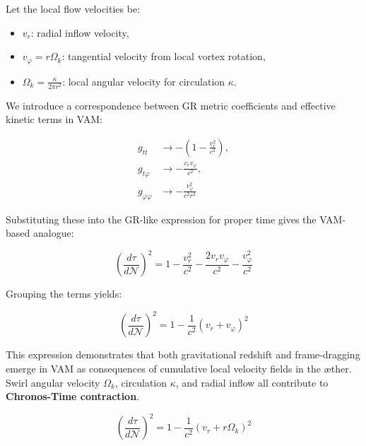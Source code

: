 Let the local flow velocities be:

\begin{itemize}
 \item \( v_r \): radial inflow velocity,
 \item \( v_\varphi = r\Omega_k \): tangential velocity from local vortex rotation,
 \item \( \Omega_k = \frac{\kappa}{2\pi r^2} \): local angular velocity for circulation \( \kappa \).
\end{itemize}

We introduce a correspondence between GR metric coefficients and effective kinetic terms in VAM:

\begin{equation}
 \begin{aligned}
  g_{tt} &\rightarrow -\left(1 - \frac{v_r^2}{c^2}\right), \\
  g_{t\varphi} &\rightarrow -\frac{v_r v_\varphi}{c^2}, \\
  g_{\varphi\varphi} &\rightarrow -\frac{v_\varphi^2}{c^2 r^2}
 \end{aligned}
 \label{eq:VAM_metric_terms}
\end{equation}

Substituting these into the GR-like expression for proper time gives the VAM-based analogue:

\begin{equation}
 \left( \frac{d\tau}{d\mathcal{N}} \right)^2 = 1 - \frac{v_r^2}{c^2} - \frac{2v_r v_\varphi}{c^2} - \frac{v_\varphi^2}{c^2}
 \label{eq:VAM_proper_time}
\end{equation}

Grouping the terms yields:

\begin{equation}
 \left( \frac{d\tau}{d\mathcal{N}} \right)^2 = 1 - \frac{1}{c^2}(v_r + v_\varphi)^2
 \label{eq:VAM_proper_time_combined}
\end{equation}

This expression demonstrates that both gravitational redshift and frame-dragging emerge in VAM as consequences of cumulative local velocity fields in the æther. Swirl angular velocity \( \Omega_k \), circulation \( \kappa \), and radial inflow all contribute to \textbf{Chronos-Time contraction}.

\begin{equation}
 \boxed{\left( \frac{d\tau}{d\mathcal{N}} \right)^2 = 1 - \frac{1}{c^2}(v_r + r\Omega_k)^2}
 \label{eq:VAM_proper_time_final}
\end{equation}

